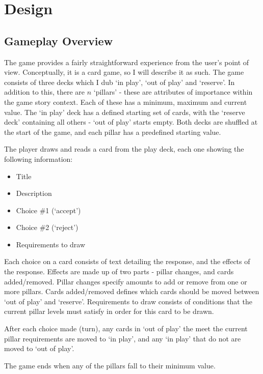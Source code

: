 \chapter{Design}


\section{Gameplay Overview}
The game provides a fairly straightforward experience from the user's point of view.
Conceptually, it is a card game, so I will describe it as such.
The game consists of three decks which I dub `in play', `out of play' and `reserve'. In addition to this, there are $n$ `pillars' - these are attributes of importance within the game story context. Each of these has a minimum, maximum and current value.
The `in play' deck has a defined starting set of cards, with the `reserve deck' containing all others - `out of play' starts empty.
Both decks are shuffled at the start of the game, and each pillar has a predefined starting value.

The player draws and reads a card from the play deck, each one showing the following information:

\begin{itemize}
	\item Title
	\item Description
	\item Choice \#1 (`accept')
	\item Choice \#2 (`reject')
	\item Requirements to draw
\end{itemize}
Each choice on a card consists of text detailing the response, and the effects of the response. Effects are made up of two parts - pillar changes, and cards added/removed. Pillar changes specify amounts to add or remove from one or more pillars. Cards added/removed defines which cards should be moved between `out of play' and `reserve'.
Requirements to draw consists of conditions that the current pillar levels must satisfy in order for this card to be drawn.

After each choice made (turn), any cards in `out of play' the meet the current pillar requirements are moved to `in play', and any `in play' that do not are moved to `out of play'.

The game ends when any of the pillars fall to their minimum value.

